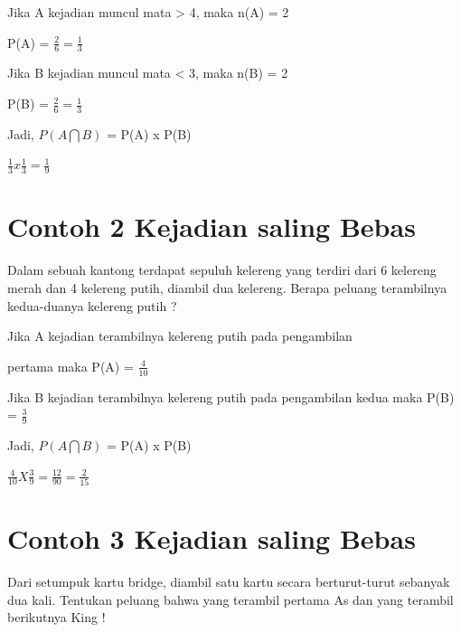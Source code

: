 \documentclass[11pt,fleqn]{book} %
\begin{document}
{Jika A kejadian muncul mata > 4, maka n(A) = 2


P(A) = $ \frac{2}{6} = \frac{1}{3} $

\vspace{0.5in}

Jika B kejadian muncul mata < 3, maka n(B) = 2


P(B) = $ \frac{2}{6} = \frac{1}{3} $

\vspace{0.5in}

Jadi, $ P(A \bigcap B) $ = P(A) x P(B)

$ \frac{1}{3} x \frac{1}{3} = \frac{1}{9} $

\vspace{0.5in}
\section{Contoh 2 Kejadian saling Bebas}
Dalam sebuah kantong terdapat sepuluh kelereng yang terdiri dari 6 kelereng merah dan 4 kelereng putih, diambil dua kelereng. Berapa peluang terambilnya kedua-duanya kelereng putih ?

\vspace{0.5in}

Jika A kejadian terambilnya kelereng putih pada pengambilan

\vspace{0.5in}

pertama maka P(A) = $ \frac{4}{10} $

\vspace{0.5in}
Jika B kejadian terambilnya kelereng putih pada pengambilan 
\vspace{0.5in}
kedua maka P(B) = $ \frac{3}{9} $

\vspace{0.5in}

Jadi, $ P(A \bigcap  B) $ = P(A) x P(B)

\vspace{0.5in}

$ \frac{4}{10} X \frac{3}{9} = \frac{12}{90} = \frac{2}{15} $

\vspace{0.5in}
\section{Contoh 3 Kejadian saling Bebas}

Dari setumpuk kartu bridge, diambil satu kartu secara berturut-turut sebanyak dua kali. Tentukan peluang bahwa yang terambil pertama As dan yang terambil berikutnya King !

}
\end{document}
